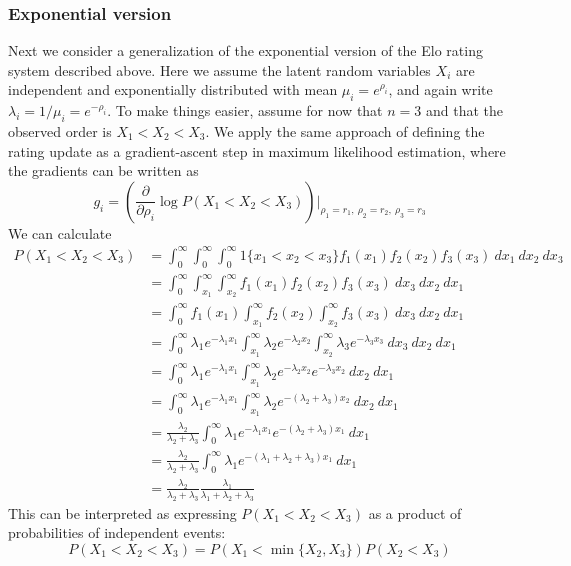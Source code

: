 \documentclass{article}
\begin{document}
	\subsubsection{Exponential version}
	Next we consider a generalization of the exponential version of the Elo rating system described above. Here we assume
	the latent random variables $X_i$ are independent and exponentially distributed with mean $\mu_i = e^{\rho_i}$, and
	again write $\lambda_i = 1 / \mu_i = e^{-\rho_i}$. To make
	things easier, assume for now that $n=3$ and that the observed order is $X_1 < X_2 < X_3$. We apply the same approach of
	defining the rating update as a gradient-ascent step in maximum likelihood estimation, where the gradients can be written as
	$$g_i = \left(\frac{\partial}{\partial \rho_i} \log P(X_1 < X_2 < X_3)\right) \bigg|_{\rho_1=r_1,\ \rho_2=r_2,\ \rho_3=r_3}$$
	We can calculate
	\begin{align*}
		P(X_1 < X_2 < X_3) &= \int_0^{\infty} \int_0^{\infty} \int_0^{\infty} 1\{x_1 < x_2 < x_3\} f_1(x_1) f_2(x_2) f_3(x_3)\ dx_1\ dx_2\ dx_3 \\
		&= \int_0^{\infty} \int_{x_1}^{\infty} \int_{x_2}^{\infty} f_1(x_1) f_2(x_2) f_3(x_3)\ dx_3\ dx_2\ dx_1 \\
		&= \int_0^{\infty} f_1(x_1) \int_{x_1}^{\infty} f_2(x_2) \int_{x_2}^{\infty} f_3(x_3)\ dx_3\ dx_2\ dx_1 \\
		&= \int_0^{\infty} \lambda_1 e^{-\lambda_1 x_1} \int_{x_1}^{\infty} \lambda_2 e^{-\lambda_2 x_2} \int_{x_2}^{\infty} \lambda_3 e^{-\lambda_3 x_3}\ dx_3\ dx_2\ dx_1 \\
		&= \int_0^{\infty} \lambda_1 e^{-\lambda_1 x_1} \int_{x_1}^{\infty} \lambda_2 e^{-\lambda_2 x_2} e^{-\lambda_3 x_2}\ dx_2\ dx_1 \\
		&= \int_0^{\infty} \lambda_1 e^{-\lambda_1 x_1} \int_{x_1}^{\infty} \lambda_2 e^{-(\lambda_2 + \lambda_3)x_2} \ dx_2\ dx_1 \\
		&= \frac{\lambda_2}{\lambda_2 + \lambda_3} \int_0^{\infty} \lambda_1 e^{-\lambda_1 x_1} e^{-(\lambda_2 + \lambda_3)x_1} \ dx_1 \\
		&= \frac{\lambda_2}{\lambda_2 + \lambda_3} \int_0^{\infty} \lambda_1 e^{-(\lambda_1 + \lambda_2 + \lambda_3)x_1} \ dx_1 \\
		&= \frac{\lambda_2}{\lambda_2 + \lambda_3} \frac{\lambda_1}{\lambda_1 + \lambda_2 + \lambda_3}
	\end{align*}
	This can be interpreted as expressing $P(X_1 < X_2 < X_3)$ as a product of probabilities of independent events:
	$$P(X_1 < X_2 < X_3) = P(X_1 < \min\{X_2, X_3\})P(X_2 < X_3)$$
\end{document}
